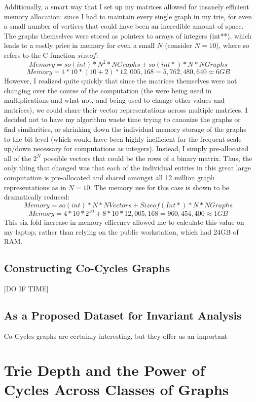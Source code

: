 Additionally, a smart way that I set up my matrices allowed for insanely efficient memory allocation: since I had to maintain every single graph in my trie, for even a small number of vertices that could have been an incredible amount of space.
The graphs themselves were stored as pointers to arrays of integers (int**), which leads to a costly price in memory for even a small $N$ (consider $N=10$), where so refers to the C function $sizeof$:
$$Memory = so(int) * N^2 * NGraphs + so(int*) * N * NGraphs $$
$$Memory = 4 * 10 * (10+2) * 12,005,168 = 5,762,480,640 \approx 6 GB $$
However, I realized quite quickly that since the matrices themselves were not changing over the course of the computation (the were being used in multiplications and what not, and being used to change other values and matrices), we could share their vector representations across multiple matrices.
I decided not to have my algorithm waste time trying to canonize the graphs or find similarities, or shrinking down the individual memory storage of the graphs to the bit level (which would have been highly inefficient for the frequent scale-up/down necessary for computations as integers).
Instead, I simply pre-allocated all of the $2^N$ possible vectors that could be the rows of a binary matrix.
Thus, the only thing that changed was that each of the individual entries in this great large computation is pre-allocated and shared amongst all 12 million graph representations as in $N = 10$.  The memory use for this case is shown to be dramatically reduced:
$$Memory = so(int) * N * NVectors + Sizeof(Int*) * N * NGraphs$$
$$Memory = 4 * 10 * 2^{10} + 8 * 10 * 12,005,168 = 960,454,400 \approx 1 GB $$
This six fold increase in memory efficency allowed me to calculate this value on my laptop, rather than relying on the public workstation, which had 24GB of RAM.


\subsection{Constructing Co-Cycles Graphs}

[DO IF TIME]

\subsection{As a Proposed Dataset for Invariant Analysis}

Co-Cycles graphs are certainly interesting, but they offer us an important 

\section{Trie Depth and the Power of Cycles Across Classes of Graphs}

